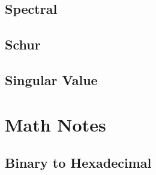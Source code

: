 \documentclass[10pt,letterpaper]{scrartcl}
\begin{document}
\subsection{Spectral}
\subsection{Schur}
\subsection{Singular Value}


\newpage\section{Math Notes}
\subsection{Binary to Hexadecimal}
\end{document}
